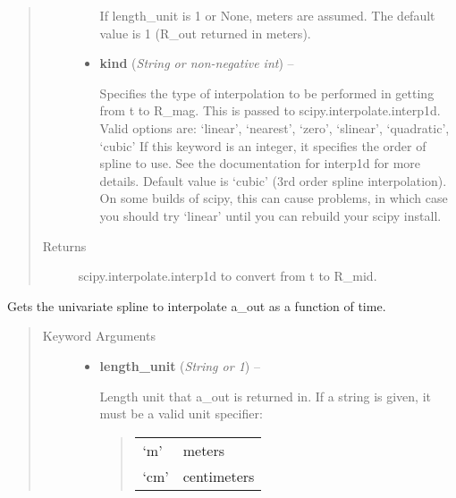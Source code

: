 \documentclass[letterpaper,10pt,english]{sphinxmanual}
\begin{document}
\begin{fulllineitems}
\begin{fulllineitems}
\begin{quote}
\begin{description}
\begin{itemize}
If length\_unit is 1 or None, meters are assumed. The default
value is 1 (R\_out returned in meters).

\item {} 
\textbf{kind} (\emph{String or non-negative int}) --

Specifies the type of interpolation
to be performed in getting from t to R\_mag. This is
passed to scipy.interpolate.interp1d. Valid options are:
`linear', `nearest', `zero', `slinear', `quadratic', `cubic'
If this keyword is an integer, it specifies the order of spline
to use. See the documentation for interp1d for more details.
Default value is `cubic' (3rd order spline interpolation). On
some builds of scipy, this can cause problems, in which case
you should try `linear' until you can rebuild your scipy install.

\end{itemize}

\item[{Returns}] \leavevmode
scipy.interpolate.interp1d to convert from t to R\_mid.

\end{description}\end{quote}

\end{fulllineitems}


\begin{fulllineitems}
\label{eqtools:eqtools.core.Equilibrium.getAOutSpline}
Gets the univariate spline to interpolate a\_out as a function of time.
\begin{quote}\begin{description}
\item[{Keyword Arguments}] \leavevmode\begin{itemize}
\item {} 
\textbf{length\_unit} (\emph{String or 1}) --

Length unit that a\_out is returned in. If
a string is given, it must be a valid unit specifier:
\begin{quote}

\begin{tabulary}{\linewidth}{|L|L|}
\hline

`m'
 & 
meters
\\

`cm'
 & 
centimeters
\\


\end{tabulary}
\end{quote}
\end{itemize}
\end{description}
\end{quote}
\end{fulllineitems}
\end{fulllineitems}
\end{document}
